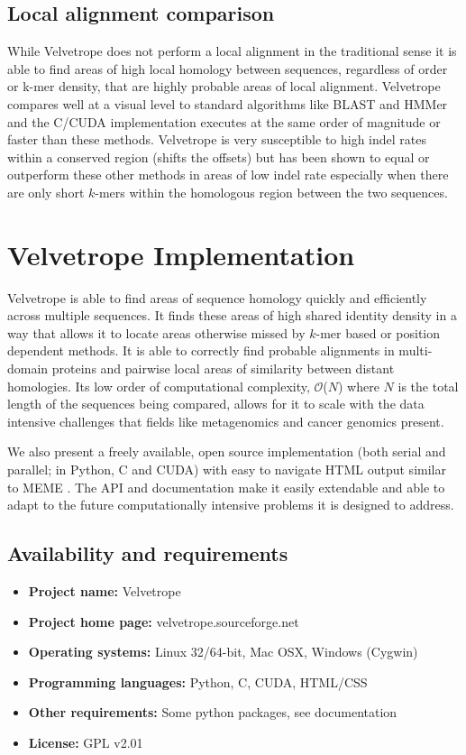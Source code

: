 \documentclass[phd,tocprelim]{cornell}
\begin{document}
\section*{Local alignment comparison}

While Velvetrope does not perform a local alignment in the traditional sense it is able to find areas of high local homology between sequences, regardless of order or k-mer density, that are highly probable areas of local alignment. Velvetrope compares well at a visual level to standard algorithms like BLAST \cite{BLAST} and HMMer \cite{Eddy98} and the C/CUDA implementation executes at the same order of magnitude or faster than these methods. Velvetrope is very susceptible to high indel rates within a conserved region (shifts the offsets) but has been shown to equal or outperform these other methods in areas of low indel rate especially when there are only short $k$-mers within the homologous region between the two sequences.


\chapter{Velvetrope Implementation} %
\label{cha:Velvetrope Implementation}

Velvetrope is able to find areas of sequence homology quickly and efficiently across multiple sequences. It finds these areas of high shared identity density in a way that allows it to locate areas otherwise missed by $k$-mer based or position dependent methods. It is able to correctly find probable alignments in multi-domain proteins and pairwise local areas of similarity between distant homologies. Its low order of computational complexity, $\mathcal O$($N$) where $N$ is the total length of the sequences
being compared, allows for it to scale with the data intensive challenges that fields like metagenomics and cancer genomics present.

We also present a freely available, open source implementation (both serial and parallel; in Python, C and CUDA) with easy to navigate HTML output similar to MEME \cite{MEME}. The API and documentation make it easily extendable and able to adapt to the future computationally intensive problems it is designed to address.

\section{Availability and requirements}
 \begin{itemize}
  \item \textbf{Project name:} Velvetrope
  \item \textbf{Project home page:} velvetrope.sourceforge.net
  \item \textbf{Operating systems:} Linux 32/64-bit, Mac OSX, Windows (Cygwin)
  \item \textbf{Programming languages:} Python, C, CUDA, HTML/CSS
  \item \textbf{Other requirements:} Some python packages, see documentation
  \item \textbf{License:} GPL v2.01
 \end{itemize}
\end{document}
